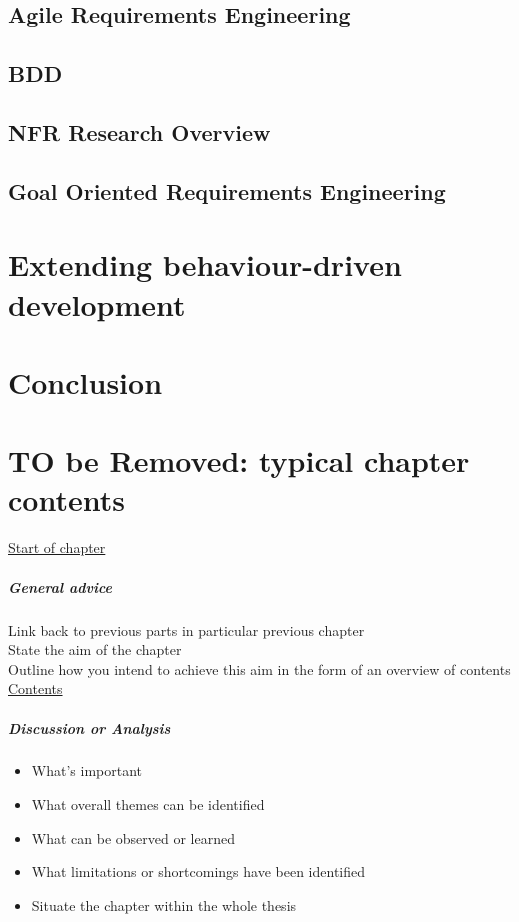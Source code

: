 \documentclass[dissertation]{softeng}
\begin{document}
\section{Agile Requirements Engineering}
\label{ch:Background:sec:agore}

\section{BDD}
\label{ch:Background:sec:bdd}

\section{NFR Research Overview}
\label{ch:Background:sec:nfr_research}

\section{Goal Oriented Requirements Engineering}
\label{ch:Background:sec:gore}

\pagebreak

\chapter{Extending behaviour-driven development}
\label{ch:Extendingbdd}

\chapter{Conclusion}
\label{ch:Conclusion}

\appendix

\chapter{TO be Removed: typical chapter contents}

\underline{Start of chapter}
\paragraph{General advice}
Link back to previous parts in particular previous chapter\\
State the aim of the chapter\\
Outline how you intend to achieve this aim in the form of an overview of contents\\

\noindent\underline{Contents}
\paragraph{Discussion or Analysis}
\begin{itemize}
\item What's important
\item What overall themes can be identified
\item What can be observed or learned
\item What limitations or shortcomings have been identified
\item Situate the chapter within the whole thesis
\end{itemize}
\end{document}
